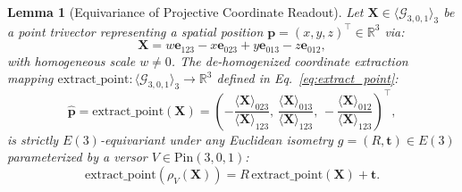 \documentclass[10pt]{article}
\newtheorem{lemma}{Lemma}
\begin{document}
\begin{lemma}[Equivariance of Projective Coordinate Readout]
\label{lem:point_readout_equivariance}
Let $\mathbf{X} \in \langle \mathcal{G}_{3,0,1} \rangle_3$ be a point trivector representing a spatial position $\mathbf{p} = (x, y, z)^\top \in \mathbb{R}^3$ via:
\begin{equation}
    \mathbf{X} = w \mathbf{e}_{123} - x \mathbf{e}_{023} + y \mathbf{e}_{013} - z \mathbf{e}_{012},
\end{equation}
with homogeneous scale $w \neq 0$. The de-homogenized coordinate extraction mapping $\mathrm{extract\_point}: \langle \mathcal{G}_{3,0,1} \rangle_3 \to \mathbb{R}^3$ defined in Eq.~\ref{eq:extract_point}:
\begin{equation}
    \hat{\mathbf{p}} = \mathrm{extract\_point}(\mathbf{X}) = \left( -\frac{\langle \mathbf{X} \rangle_{023}}{\langle \mathbf{X} \rangle_{123}},\, \frac{\langle \mathbf{X} \rangle_{013}}{\langle \mathbf{X} \rangle_{123}},\, -\frac{\langle \mathbf{X} \rangle_{012}}{\langle \mathbf{X} \rangle_{123}} \right)^\top,
\end{equation}
is strictly $E(3)$-equivariant under any Euclidean isometry $g = (R, \mathbf{t}) \in E(3)$ parameterized by a versor $V \in \mathrm{Pin}(3,0,1)$:
\begin{equation}
    \mathrm{extract\_point}(\rho_V(\mathbf{X})) = R \, \mathrm{extract\_point}(\mathbf{X}) + \mathbf{t}.
\end{equation}
\end{lemma}
\end{document}

